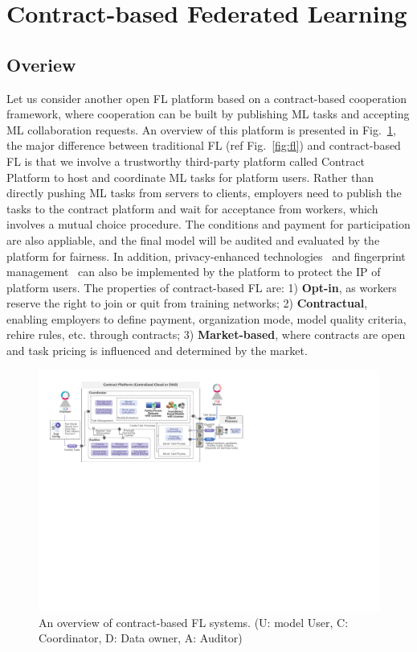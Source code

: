 \section{Contract-based Federated Learning}
\label{sec:contract}
\subsection{Overiew}
\label{sec:contract_overview}
Let us consider another open FL platform based on a contract-based cooperation framework, where cooperation can be built by publishing ML tasks and accepting ML collaboration requests.
An overview of this platform is presented in Fig.~\ref{fig:contract}, the major difference between traditional FL (ref Fig.~\ref{fig:fl}) and contract-based FL is that we involve a trustworthy third-party platform called Contract Platform to host and coordinate ML tasks for platform users.
Rather than directly pushing ML tasks from servers to clients, employers need to publish the tasks to the contract platform and wait for acceptance from workers, which involves a mutual choice procedure. 
The conditions and payment for participation are also appliable, and the final model will be audited and evaluated by the platform for fairness.
In addition, privacy-enhanced technologies~\cite{hesamifard2018privacy} and fingerprint management~\cite{chen2022copy} can also be implemented by the platform to protect the IP of platform users.
The properties of contract-based FL are: 1) \textbf{Opt-in}, as workers reserve the right to join or quit from training networks; 2) \textbf{Contractual}, enabling employers to define payment, organization mode, model quality criteria, rehire rules, etc. through contracts; 3) \textbf{Market-based}, where contracts are open and task pricing is influenced and determined by the market.

\begin{figure}[t]
    \centering
    \includegraphics[width=\linewidth]{fig/contract_frame.pdf}
    \caption{An overview of contract-based FL systems. (U: model User, C: Coordinator, D: Data owner, A: Auditor)}
    \label{fig:contract}
    \vspace{-5mm}
\end{figure}

